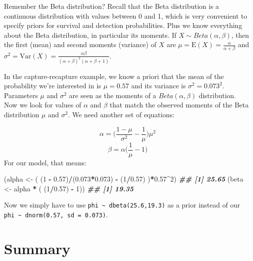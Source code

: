 \documentclass[
  12pt,
]{krantz}
\newenvironment{Shaded}{\begin{snugshade}}{\end{snugshade}}
\newcommand{\DecValTok}[1]{\textcolor[rgb]{0.00,0.00,0.81}{#1}}
\newcommand{\DocumentationTok}[1]{\textcolor[rgb]{0.56,0.35,0.01}{\textbf{\textit{#1}}}}
\newcommand{\FloatTok}[1]{\textcolor[rgb]{0.00,0.00,0.81}{#1}}
\newcommand{\NormalTok}[1]{#1}
\newcommand{\OtherTok}[1]{\textcolor[rgb]{0.56,0.35,0.01}{#1}}
\newcommand{\SpecialCharTok}[1]{\textcolor[rgb]{0.81,0.36,0.00}{\textbf{#1}}}
\begin{document}
Remember the Beta distribution? Recall that the Beta distribution is a continuous distribution with values between 0 and 1, which is very convenient to specify priors for survival and detection probabilities. Plus we know everything about the Beta distribution, in particular its moments. If \(X \sim Beta(\alpha,\beta)\), then the first (mean) and second moments (variance) of \(X\) are \(\mu = \text{E}(X) = \frac{\alpha}{\alpha + \beta}\) and \(\sigma^2 = \text{Var}(X) = \frac{\alpha\beta}{(\alpha + \beta)^2 (\alpha + \beta + 1)}\).

In the capture-recapture example, we know a priori that the mean of the probability we're interested in is \(\mu = 0.57\) and its variance is \(\sigma^2 = 0.073^2\). Parameters \(\mu\) and \(\sigma^2\) are seen as the moments of a \(Beta(\alpha,\beta)\) distribution. Now we look for values of \(\alpha\) and \(\beta\) that match the observed moments of the Beta distribution \(\mu\) and \(\sigma^2\). We need another set of equations:

\[\alpha = \bigg(\frac{1-\mu}{\sigma^2}- \frac{1}{\mu} \bigg)\mu^2\]
\[\beta = \alpha \bigg(\frac{1}{\mu}-1\bigg)\]
For our model, that means:

\begin{Shaded}
\begin{Highlighting}[]
\NormalTok{(alpha }\OtherTok{\textless{}{-}}\NormalTok{ ( (}\DecValTok{1} \SpecialCharTok{{-}} \FloatTok{0.57}\NormalTok{)}\SpecialCharTok{/}\NormalTok{(}\FloatTok{0.073}\SpecialCharTok{*}\FloatTok{0.073}\NormalTok{) }\SpecialCharTok{{-}}\NormalTok{ (}\DecValTok{1}\SpecialCharTok{/}\FloatTok{0.57}\NormalTok{) )}\SpecialCharTok{*}\FloatTok{0.57}\SpecialCharTok{\^{}}\DecValTok{2}\NormalTok{)}
\DocumentationTok{\#\# [1] 25.65}
\NormalTok{(beta }\OtherTok{\textless{}{-}}\NormalTok{ alpha }\SpecialCharTok{*}\NormalTok{ ( (}\DecValTok{1}\SpecialCharTok{/}\FloatTok{0.57}\NormalTok{) }\SpecialCharTok{{-}} \DecValTok{1}\NormalTok{))}
\DocumentationTok{\#\# [1] 19.35}
\end{Highlighting}
\end{Shaded}

Now we simply have to use \texttt{phi\ \textasciitilde{}\ dbeta(25.6,19.3)} as a prior instead of our \texttt{phi\ \textasciitilde{}\ dnorm(0.57,\ sd\ =\ 0.073)}.

\section{Summary}\label{summary-3}
\end{document}
